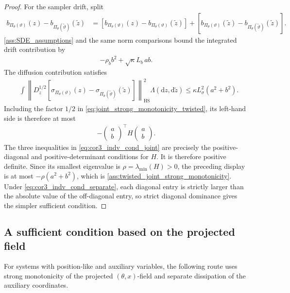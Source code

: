 \begin{proof}
For the sampler drift, split
\begin{align*}
b_{\Pi_\theta(\vartheta)}(z)
-b_{\Pi_\theta(\tilde\vartheta)}(\tilde z)
&=
\left[
b_{\Pi_\theta(\vartheta)}(z)
-b_{\Pi_\theta(\vartheta)}(\tilde z)
\right]+
\left[
b_{\Pi_\theta(\vartheta)}(\tilde z)
-b_{\Pi_\theta(\tilde\vartheta)}(\tilde z)
\right].
\end{align*}
\ref{ass:SDE_assumptions} and the same norm comparisons bound the
integrated drift contribution by
\begin{align*}
-\rho_b b^2+\sqrt\kappa L_b\,ab.
\end{align*}
The diffusion contribution satisfies
\begin{align*}
&\int
\left\|D_z^{1/2}
\left[
\sigma_{\Pi_\theta(\vartheta)}(z)
-\sigma_{\Pi_\theta(\tilde\vartheta)}(\tilde z)
\right]
\right\|_{\mathrm{HS}}^2
\Lambda(\mathrm dz,\mathrm d\tilde z)\leq
\kappa L_\sigma^2(a^2+b^2).
\end{align*}
Including the factor $1/2$ in
\eqref{eq:joint_strong_monotonicity_twisted}, its left-hand side is therefore
at most
\begin{align*}
-
\begin{pmatrix}a\\b\end{pmatrix}^{\!\top}
H
\begin{pmatrix}a\\b\end{pmatrix}.
\end{align*}
The three inequalities in \eqref{eq:cor3_indv_cond_joint} are precisely the
positive-diagonal and positive-determinant conditions for $H$.  It is
therefore positive definite.  Since its smallest eigenvalue is
$\rho=\lambda_{\min}(H)>0$, the preceding display is at most
$-\rho(a^2+b^2)$, which is
\ref{ass:twisted_joint_strong_monotonicity}.  Under
\eqref{eq:cor3_indv_cond_separate}, each diagonal entry is strictly larger
than the absolute value of the off-diagonal entry, so strict diagonal
dominance gives the simpler sufficient condition.
\end{proof}

\subsection{A sufficient condition based on the projected field}
\label{app:cor_projected_strong_convexity}

For systems with position-like and auxiliary variables, the following route
uses strong monotonicity of the projected $(\theta,x)$-field and separate
dissipation of the auxiliary coordinates.

